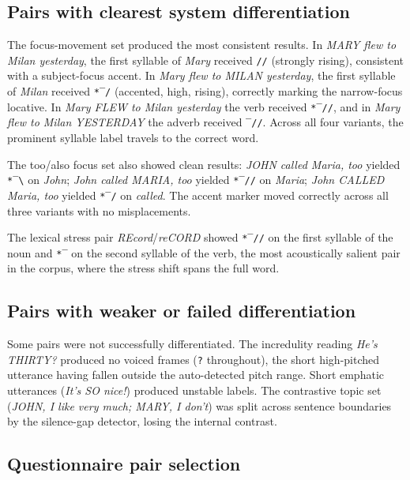 \subsection{Pairs with clearest system differentiation}

The focus-movement set produced the most consistent results. In \textit{MARY
flew to Milan yesterday}, the first syllable of \textit{Mary} received
\texttt{//} (strongly rising), consistent with a subject-focus accent. In
\textit{Mary flew to MILAN yesterday}, the first syllable of \textit{Milan}
received \texttt{*‾/} (accented, high, rising), correctly marking the
narrow-focus locative. In \textit{Mary FLEW to Milan yesterday} the verb
received \texttt{*‾//}, and in \textit{Mary flew to Milan YESTERDAY} the
adverb received \texttt{‾//}. Across all four variants, the prominent
syllable label travels to the correct word.

The too/also focus set also showed clean results: \textit{JOHN called Maria,
too} yielded \texttt{*‾\textbackslash} on \textit{John}; \textit{John called
MARIA, too} yielded \texttt{*‾//} on \textit{Maria}; \textit{John CALLED
Maria, too} yielded \texttt{*‾/} on \textit{called}. The accent marker moved
correctly across all three variants with no misplacements.

The lexical stress pair \textit{REcord}/\textit{reCORD} showed \texttt{*‾//}
on the first syllable of the noun and \texttt{*‾} on the second syllable of
the verb, the most acoustically salient pair in the corpus, where the
stress shift spans the full word.

\subsection{Pairs with weaker or failed differentiation}

Some pairs were not successfully differentiated. The incredulity reading
\textit{He's THIRTY?} produced no voiced frames (\texttt{?} throughout), the
short high-pitched utterance having fallen outside the auto-detected pitch
range. Short emphatic utterances (\textit{It's SO nice!}) produced unstable
labels. The contrastive topic set (\textit{JOHN, I like very much; MARY, I
don't}) was split across sentence boundaries by the silence-gap detector,
losing the internal contrast.

\subsection{Questionnaire pair selection}

